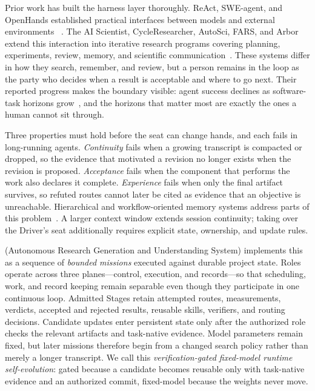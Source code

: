 Prior work has built the harness layer thoroughly. ReAct, SWE-agent, and OpenHands
established practical interfaces between models and external environments
~\citep{yao2023react,yang2024sweagent,wang2024openhands}. The AI Scientist,
CycleResearcher, AutoSci, FARS, and Arbor extend this interaction into iterative
research programs covering planning, experiments, review, memory, and scientific
communication~\citep{lu2024aiscientist,weng2025cycleresearcher,qian2026autosci,
tang2026fars,jin2026arbor}. These systems differ in how they search, remember, and
review, but a person remains in the loop as the party who decides when a result is
acceptable and where to go next. Their reported progress makes the boundary visible:
agent success declines as software-task horizons grow~\citep{kwa2025longtasks}, and
the horizons that matter most are exactly the ones a human cannot sit through.

Three properties must hold before the seat can change hands, and each fails in
long-running agents. \emph{Continuity} fails when a growing transcript is compacted
or dropped, so the evidence that motivated a revision no longer exists when the
revision is proposed. \emph{Acceptance} fails when the component that performs the
work also declares it complete. \emph{Experience} fails when only the final artifact
survives, so refuted routes cannot later be cited as evidence that an objective is
unreachable. Hierarchical and workflow-oriented memory systems address parts of this
problem~\citep{packer2023memgpt,wang2024workflowmemory,xu2025amem}. A larger context
window extends session continuity; taking over the Driver's seat additionally
requires explicit state, ownership, and update rules.

\systemname (Autonomous Research Generation and Understanding System) implements
this as a sequence of \emph{bounded missions} executed against durable project state.
Roles operate across three planes---control, execution, and records---so that
scheduling, work, and record keeping remain separable even though they participate in
one continuous loop. Admitted Stages retain attempted routes, measurements, verdicts,
accepted and rejected results, reusable skills, verifiers, and routing decisions.
Candidate updates enter persistent state only after the authorized role checks the
relevant artifacts and task-native evidence. Model parameters remain fixed, but later
missions therefore begin from a changed search policy rather than merely a longer
transcript. We call this \emph{verification-gated fixed-model runtime
self-evolution}: gated because a candidate becomes reusable only with task-native
evidence and an authorized commit, fixed-model because the weights never move.

